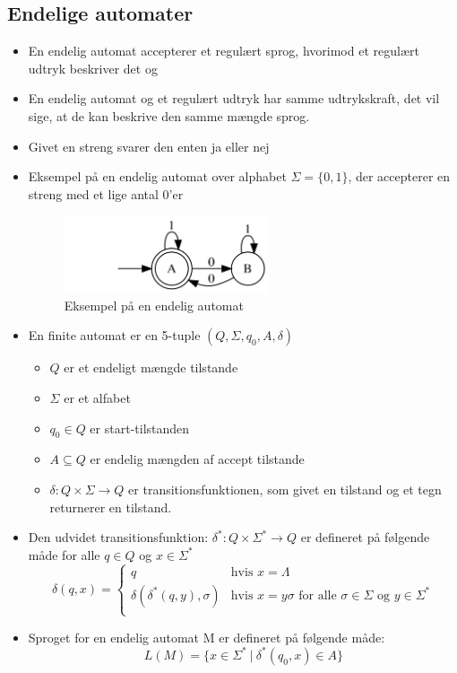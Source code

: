\documentclass[a4, danish]{article}
\begin{document}
  \subsection{Endelige automater}
  \begin{itemize}
    \item En endelig automat accepterer et regulært sprog, hvorimod et regulært udtryk beskriver det og
    \item En endelig automat og et regulært udtryk har samme udtrykskraft, det vil sige, at de kan beskrive den samme mængde sprog. 
    \item Givet en streng svarer den enten ja eller nej
    \item Eksempel på en endelig automat over alphabet $\Sigma=\{0,1\}$, der accepterer en streng med et lige antal 0'er
    \begin{figure}[ht!]
	  \centering
	  \includegraphics[width=60mm]{img/FAeks.png}
	  \caption{Eksempel på en endelig automat	\label{FAeks2}}
    \end{figure}
    \item En finite automat er en 5-tuple $(Q, \Sigma, q_0, A, \delta)$
    \begin{itemize}
	    \item $Q$ er et endeligt mængde tilstande
      \item $\Sigma$ er et alfabet
      \item $q_0 \in Q$ er start-tilstanden
      \item $A \subseteq Q$ er endelig mængden af accept tilstande
      \item $\delta: Q \times \Sigma \rightarrow Q$ er transitionsfunktionen, som givet en tilstand og et tegn returnerer en tilstand. 
    \end{itemize}
    \item Den udvidet transitionsfunktion: $\delta^*: Q \times \Sigma^* \rightarrow Q$ er defineret på følgende måde for alle $q\in Q$ og $x \in \Sigma^*$
 	 	\begin{equation*}
		\delta(q,x) =
		\begin{cases}
			\mbox{$q$} & \mbox{hvis $x = \Lambda$} \\
			\mbox{$\delta(\delta^*(q,y),\sigma)$} & \mbox{hvis $x=y\sigma$ for alle $\sigma \in \Sigma$ og $y\in \Sigma^*$} \\
		\end{cases}
		\end{equation*}
    \item Sproget for en endelig automat M er defineret på følgende måde:
    \begin{equation*}
      L(M)=\{x \in \Sigma^* \ | \ \delta^*(q_0,x)\in A \}
    \end{equation*}


\end{itemize}
\end{document}
